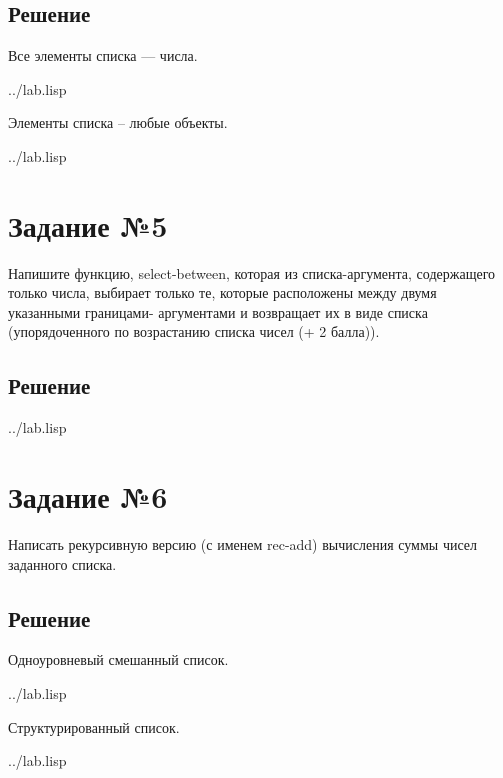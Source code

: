 \subsection*{Решение}
Все элементы списка --- числа.
\begin{lstinputlisting}[label=third,caption=Решение задания №4.1, language=lisp, firstline=22, lastline=24]{../lab.lisp}
\end{lstinputlisting}

Элементы списка -- любые объекты.
\begin{lstinputlisting}[label=third,caption=Решение задания №4.2, language=lisp, firstline=26, lastline=30]{../lab.lisp}
\end{lstinputlisting}

\section*{Задание №5}
Напишите функцию, select-between, которая из списка-аргумента, содержащего только
числа, выбирает только те, которые расположены между двумя указанными границами-
аргументами и возвращает их в виде списка (упорядоченного по возрастанию списка чисел
(+ 2 балла)).

\subsection*{Решение}
\begin{lstinputlisting}[label=third,caption=Решение задания №5, language=lisp, firstline=33, lastline=39]{../lab.lisp}
\end{lstinputlisting}


\section*{Задание №6}
Написать рекурсивную версию (с именем rec-add) вычисления суммы чисел заданного
списка.
\subsection*{Решение}

Одноуровневый смешанный список.
\begin{lstinputlisting}[label=third,caption=Решение задания №6.1, language=lisp, firstline=42, lastline=47]{../lab.lisp}
\end{lstinputlisting}

Структурированный список.

\begin{lstinputlisting}[label=third,caption=Решение задания №6.2, language=lisp, firstline=49, lastline=55]{../lab.lisp}
\end{lstinputlisting}

